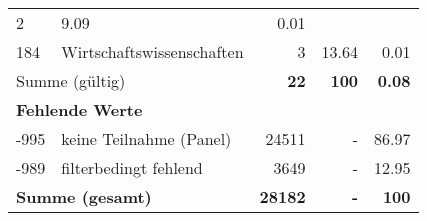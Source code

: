 \begin{longtable}{lXrrr}
       \num{2} &
       \num[round-mode=places,round-precision=2]{9.09} &
         \num[round-mode=places,round-precision=2]{0.01} \\

     184 &
     \multicolumn{1}{X}{ Wirtschaftswissenschaften   } &


       \num{3} &
       \num[round-mode=places,round-precision=2]{13.64} &
         \num[round-mode=places,round-precision=2]{0.01} \\
     \midrule
     \multicolumn{2}{l}{Summe (gültig)} &
       \textbf{\num{22}} &
     \textbf{100} &
       \textbf{\num[round-mode=places,round-precision=2]{0.08}} \\
     \multicolumn{5}{l}{\textbf{Fehlende Werte}}\\
       -995 &
       keine Teilnahme (Panel) &
         \num{24511} &
        - &
         \num[round-mode=places,round-precision=2]{86.97} \\
       -989 &
       filterbedingt fehlend &
         \num{3649} &
        - &
         \num[round-mode=places,round-precision=2]{12.95} \\
     \midrule
     \multicolumn{2}{l}{\textbf{Summe (gesamt)}} &
          \textbf{\num{28182}} &
        \textbf{-} &
        \textbf{100} \\
     \bottomrule
     \end{longtable}
     
